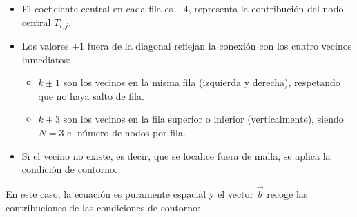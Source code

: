 \documentclass{article}
\begin{document}
\begin{itemize}
    \item El coeficiente central en cada fila es $-4$, representa la contribución del nodo central $T_{i,j}$.
    \item Los valores $+1$ fuera de la diagonal reflejan la conexión con los cuatro vecinos inmediatos:
    \begin{itemize}
        \item $k \pm 1$ son los vecinos en la misma fila (izquierda y derecha), respetando que no haya salto de fila.
        \item $k \pm 3$ son los vecinos en la fila superior o inferior (verticalmente), siendo $N = 3$ el número de nodos por fila.
    \end{itemize}
    \item Si el vecino no existe, es decir, que se localice fuera de malla, se aplica la condición de contorno.
\end{itemize}
En este caso, la ecuación es puramente espacial y el vector $\vec{b}$ recoge las contribuciones de las condiciones de contorno:
\end{document}
